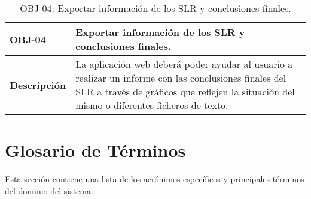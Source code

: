 \begin{table}[!hbt]
	\begin{center}
		\begin{tabular}{|p{3cm}|p{12cm}|}
			\hline
			\textbf{OBJ-04} & Exportar información de los SLR y conclusiones finales.\\
			\hline
			\textbf{Descripción} & La aplicación web deberá poder ayudar al usuario a realizar un informe con las conclusiones finales del SLR a través de gráficos que reflejen la situación del mismo o diferentes ficheros de texto.\\
			\hline
		\end{tabular}
		\caption{OBJ-04: Exportar información de los SLR y conclusiones finales.}
		\label{table:obj04}
	\end{center}
\end{table}

\section{Glosario de Términos} 
Esta sección contiene una lista de los acrónimos específicos y principales términos del dominio del sistema.\\

